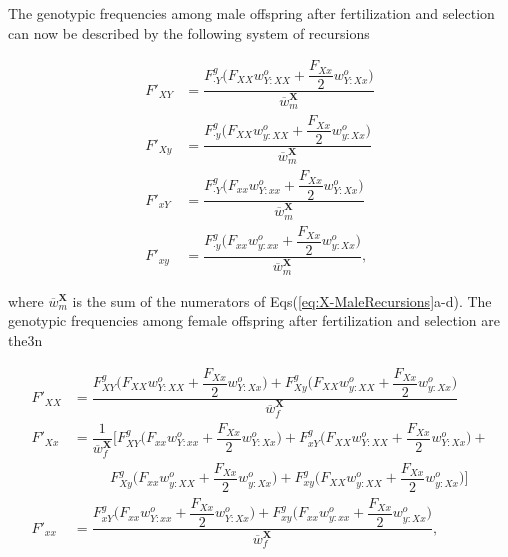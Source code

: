 \documentclass{article}
\begin{document}
The genotypic frequencies among male offspring after fertilization and selection can now be described by the following system of recursions

\begin{subequations}\label{eq:X-MaleRecursions} 
	\begin{align} 
		F'_{XY} &= \dfrac{ F_{\cdot Y}^g \bigg(F_{XX} w^{o}_{Y:XX} + \dfrac{F_{Xx}}{2} w^{o}_{Y:Xx} \bigg)}{\overline{w}^{\mathbf{X}}_{m}} \label{eq:X-XYRec1} \\ 
		F'_{Xy} &= \dfrac{ F_{\cdot y}^g \bigg(F_{XX} w^{o}_{y:XX} + \dfrac{F_{Xx}}{2} w^{o}_{y:Xx} \bigg)}{\overline{w}^{\mathbf{X}}_{m}} \label{eq:X-XyRec2} \\ 
		F'_{xY} &= \dfrac{ F_{\cdot Y}^g \bigg(F_{xx} w^{o}_{Y:xx} + \dfrac{F_{Xx}}{2} w^{o}_{Y:Xx} \bigg)}{\overline{w}^{\mathbf{X}}_{m}} \label{eq:X-xYRec3} \\ 
		F'_{xy} &= \dfrac{ F_{\cdot y}^g \bigg(F_{xx} w^{o}_{y:xx} + \dfrac{F_{Xx}}{2} w^{o}_{y:Xx} \bigg)}{\overline{w}^{\mathbf{X}}_{m}}, \label{eq:X-xyRec4}
	\end{align}
\end{subequations}

\noindent where $\overline{w}^{\mathbf{X}}_{m}$ is the sum of the numerators of Eqs(\ref{eq:X-MaleRecursions}a-d). The genotypic frequencies among female offspring after fertilization and selection are the3n

\begin{subequations}\label{eq:X-FemaleRecursions} 
	\begin{align} 
		F'_{XX} &= \dfrac{ F_{XY}^g \bigg(F_{XX} w^{o}_{Y:XX} + \dfrac{F_{Xx}}{2} w^{o}_{Y:Xx} \bigg) + F_{Xy}^g \bigg(F_{XX} w^{o}_{y:XX} + \dfrac{F_{Xx}}{2} w^{o}_{y:Xx} \bigg)}{\overline{w}^{\mathbf{X}}_{f}} \label{eq:X-XxRec1} \\ 
		F'_{Xx} &= \dfrac{1}{\overline{w}^{\mathbf{X}}_{f}} \Bigg[F_{XY}^g \bigg(F_{xx} w^{o}_{Y:xx} + \dfrac{F_{Xx}}{2} w^{o}_{Y:Xx} \bigg) + F_{xY}^g \bigg(F_{XX} w^{o}_{Y:XX} + \dfrac{F_{Xx}}{2} w^{o}_{Y:Xx} \bigg) + \nonumber\\
		&~~~~~~~~~~~~F_{Xy}^g \bigg(F_{xx} w^{o}_{y:XX} + \dfrac{F_{Xx}}{2} w^{o}_{y:Xx} \bigg) + F_{xy}^g \bigg(F_{XX} w^{o}_{y:XX} + \dfrac{F_{Xx}}{2} w^{o}_{y:Xx} \bigg) \Bigg]  \label{eq:X-XxRec2} \\ 
		F'_{xx} &= \dfrac{ F_{xY}^g \bigg(F_{xx} w^{o}_{Y:xx} + \dfrac{F_{Xx}}{2} w^{o}_{Y:Xx} \bigg) + F_{xy}^g \bigg(F_{xx} w^{o}_{y:xx} + \dfrac{F_{Xx}}{2} w^{o}_{y:Xx} \bigg)}{\overline{w}^{\mathbf{X}}_{f}}, \label{eq:X-xxRec3}
	\end{align}
\end{subequations}
\end{document}
